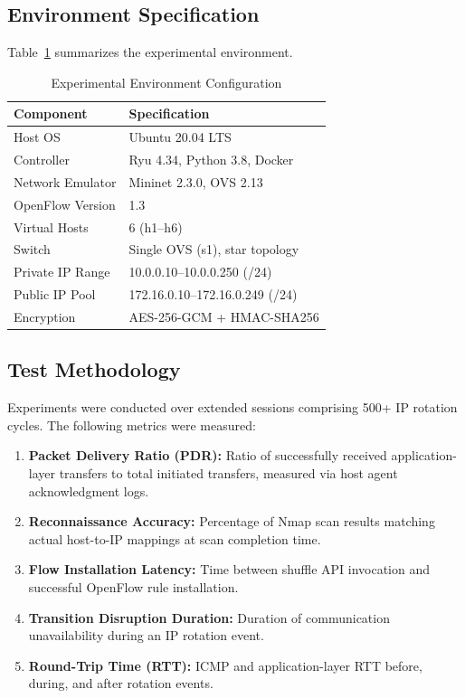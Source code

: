 \documentclass[conference]{IEEEtran}
\begin{document}
\subsection{Environment Specification}

Table~\ref{tab:env} summarizes the experimental environment.

\begin{table}[htbp]
\caption{Experimental Environment Configuration}
\label{tab:env}
\centering
\footnotesize
\begin{tabular}{ll}
\toprule
\textbf{Component} & \textbf{Specification} \\
\midrule
Host OS & Ubuntu 20.04 LTS \\
Controller & Ryu 4.34, Python 3.8, Docker \\
Network Emulator & Mininet 2.3.0, OVS 2.13 \\
OpenFlow Version & 1.3 \\
Virtual Hosts & 6 (h1--h6) \\
Switch & Single OVS (s1), star topology \\
Private IP Range & 10.0.0.10--10.0.0.250 (/24) \\
Public IP Pool & 172.16.0.10--172.16.0.249 (/24) \\
Encryption & AES-256-GCM + HMAC-SHA256 \\
\bottomrule
\end{tabular}
\end{table}

\subsection{Test Methodology}

Experiments were conducted over extended sessions comprising 500+ IP rotation cycles. The following metrics were measured:

\begin{enumerate}
    \item \textbf{Packet Delivery Ratio (PDR):} Ratio of successfully received application-layer transfers to total initiated transfers, measured via host agent acknowledgment logs.
    \item \textbf{Reconnaissance Accuracy:} Percentage of Nmap scan results matching actual host-to-IP mappings at scan completion time.
    \item \textbf{Flow Installation Latency:} Time between shuffle API invocation and successful OpenFlow rule installation.
    \item \textbf{Transition Disruption Duration:} Duration of communication unavailability during an IP rotation event.
    \item \textbf{Round-Trip Time (RTT):} ICMP and application-layer RTT before, during, and after rotation events.
\end{enumerate}
\end{document}
